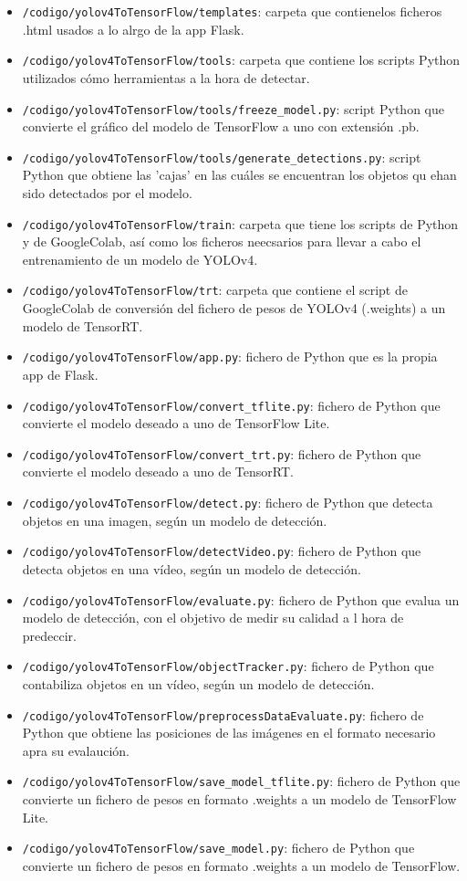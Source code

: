 \begin{itemize}
    \item \texttt{/codigo/yolov4ToTensorFlow/templates}: carpeta que contienelos ficheros .html usados a lo alrgo de la app Flask.
    \item \texttt{/codigo/yolov4ToTensorFlow/tools}: carpeta que contiene los scripts Python utilizados cómo herramientas a la hora de detectar.
    \item \texttt{/codigo/yolov4ToTensorFlow/tools/freeze\_model.py}: script Python que convierte el gráfico del modelo de TensorFlow a uno con extensión .pb.
    \item \texttt{/codigo/yolov4ToTensorFlow/tools/generate\_detections.py}: script Python que obtiene las 'cajas' en las cuáles se encuentran los objetos qu ehan sido detectados por el modelo.
    \item \texttt{/codigo/yolov4ToTensorFlow/train}: carpeta que tiene los scripts de Python y de GoogleColab, así como los ficheros neecsarios para llevar a cabo el entrenamiento de un modelo de YOLOv4.
    \item \texttt{/codigo/yolov4ToTensorFlow/trt}: carpeta que contiene el script de GoogleColab de conversión del fichero de pesos de YOLOv4 (.weights) a un modelo de TensorRT.
    \item \texttt{/codigo/yolov4ToTensorFlow/app.py}: fichero de Python que es la propia app de Flask.
    \item \texttt{/codigo/yolov4ToTensorFlow/convert\_tflite.py}: fichero de Python que convierte el modelo deseado a uno de TensorFlow Lite.
    \item \texttt{/codigo/yolov4ToTensorFlow/convert\_trt.py}: fichero de Python que convierte el modelo deseado a uno de TensorRT.
    \item \texttt{/codigo/yolov4ToTensorFlow/detect.py}: fichero de Python que detecta objetos en una imagen, según un modelo de detección.
    \item \texttt{/codigo/yolov4ToTensorFlow/detectVideo.py}: fichero de Python que detecta objetos en una vídeo, según un modelo de detección.
    \item \texttt{/codigo/yolov4ToTensorFlow/evaluate.py}: fichero de Python que evalua un modelo de detección, con el objetivo de medir su calidad a l hora de predeccir.
    \item \texttt{/codigo/yolov4ToTensorFlow/objectTracker.py}: fichero de Python que contabiliza objetos en un vídeo, según un modelo de detección.
    \item \texttt{/codigo/yolov4ToTensorFlow/preprocessDataEvaluate.py}: fichero de Python que obtiene las posiciones de las imágenes en el formato necesario apra su evalaución.
    \item \texttt{/codigo/yolov4ToTensorFlow/save\_model\_tflite.py}: fichero de Python que convierte un fichero de pesos en formato .weights a un modelo de TensorFlow Lite. 
    \item \texttt{/codigo/yolov4ToTensorFlow/save\_model.py}: fichero de Python que convierte un fichero de pesos en formato .weights a un modelo de TensorFlow. 
\end{itemize}

